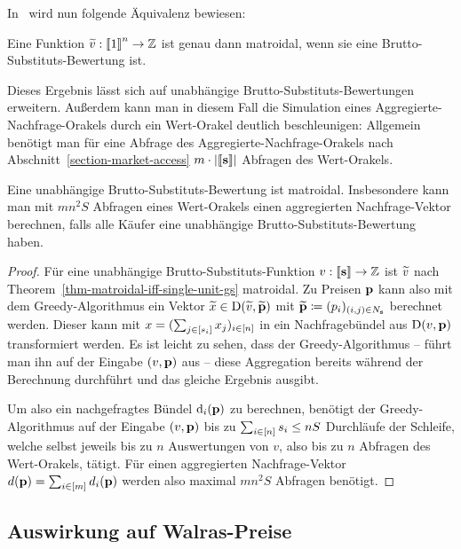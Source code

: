 In~\cite[Theorem~3.2]{PaesLeme2017} wird nun folgende Äquivalenz bewiesen:
\begin{theorem}\label{thm-matroidal-iff-single-unit-gs}
	Eine Funktion $\widetilde{v}:\left\llbracket 1 \right\rrbracket^n \rightarrow \mathbb{Z}$ ist genau dann matroidal, wenn sie eine Brutto-Substituts-Bewertung ist.
\end{theorem}
Dieses Ergebnis lässt sich auf unabhängige Brutto-Substituts-Bewertungen erweitern.
Außerdem kann man in diesem Fall die Simulation eines Aggregierte-Nachfrage-Orakels durch ein Wert-Orakel deutlich beschleunigen:
Allgemein benötigt man für eine Abfrage des Aggregierte-Nachfrage-Orakels nach Abschnitt~\ref{section-market-access} $m\cdot\left\lvert \left\llbracket \mathbf{s} \right\rrbracket \right\rvert$ Abfragen des Wert-Orakels.
\begin{korollar}\label{cor-indep-gs-matroidal}
	Eine unabhängige Brutto-Substituts-Bewertung ist matroidal.
	Insbesondere kann man mit $mn^2S$ Abfragen eines Wert-Orakels einen aggregierten  Nachfrage-Vektor berechnen, falls alle Käufer eine unabhängige Brutto-Substituts-Bewertung haben.
\end{korollar}
\begin{proof}
	Für eine unabhängige Brutto-Substituts-Funktion $v:\left\llbracket \mathbf{s} \right\rrbracket \rightarrow \mathbb{Z}$ ist $\widetilde{v}$ nach Theorem~\ref{thm-matroidal-iff-single-unit-gs} matroidal.
	Zu Preisen $\mathbf{p}$ kann also mit dem Greedy-Algorithmus ein Vektor $\widetilde{x}\in\operatorname{D}(\widetilde{v}, \widetilde{\mathbf{p}})$ mit $\widetilde{\mathbf{p}} \coloneqq (p_i)_{(i,j)\in N_{\mathbf{s}}}$ berechnet werden.
	Dieser kann mit $x=(\sum_{j\in\left[ s_i \right]} x_j)_{i\in\left[ n \right]}$ in ein Nachfragebündel aus $\operatorname{D}(v, \mathbf{p})$ transformiert werden.
	Es ist leicht zu sehen, dass der Greedy-Algorithmus -- führt man ihn auf der Eingabe $(v,\mathbf{p})$ aus -- diese Aggregation bereits während der Berechnung durchführt und das gleiche Ergebnis ausgibt.
	
	Um also ein nachgefragtes Bündel $\operatorname{d}_i(\mathbf{p})$ zu berechnen, benötigt der Greedy-Algorithmus auf der Eingabe $(v, \mathbf{p})$ bis zu $\sum_{i\in\left[ n \right]} s_i \leq nS$ Durchläufe der Schleife, welche selbst jeweils bis zu $n$ Auswertungen von $v$, also bis zu $n$ Abfragen des Wert-Orakels, tätigt.
	Für einen aggregierten Nachfrage-Vektor $d(\mathbf{p}) = \sum_{i\in\left[ m \right]} d_i(\mathbf{p})$ werden also maximal $mn^2S$ Abfragen benötigt.
\end{proof}


\subsection{Auswirkung auf Walras-Preise}

